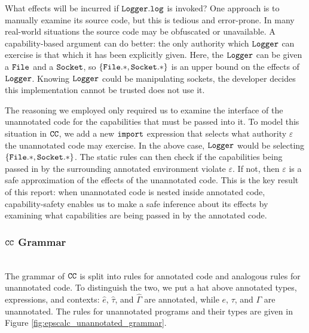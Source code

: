 What effects will be incurred if $\mathtt{Logger.log}$ is invoked? One approach is to manually examine its source code, but this is tedious and error-prone. In many real-world situations the source code may be obfuscated or unavailable. A capability-based argument can do better: the only authority which $\mathtt{Logger}$ can exercise is that which it has been explicitly given. Here, the $\mathtt{Logger}$ can be given a $\mathtt{File}$ and a $\mathtt{Socket}$, so $\mathtt{ \{ \mathtt{File.*, Socket.*} \} }$ is an upper bound on the effects of $\mathtt{Logger}$. Knowing $\mathtt{Logger}$ could be manipulating sockets, the developer decides this implementation cannot be trusted does not use it.

The reasoning we employed only required us to examine the interface of the unannotated code for the capabilities that must be passed into it. To model this situation in $\mathtt{CC}$, we add a new $\mathtt{import}$ expression that selects what authority $\varepsilon$ the unannotated code may exercise. In the above case, $\mathtt{Logger}$ would be selecting $\{ \mathtt{File.*}, \mathtt{Socket.*} \}$. The static rules can then check if the capabilities being passed in by the surrounding annotated environment violate $\varepsilon$. If not, then $\varepsilon$ is a safe approximation of the effects of the unannotated code. This is the key result of this report: when unannotated code is nested inside annotated code, capability-safety enables us to make a safe inference about its effects by examining what capabilities are being passed in by the annotated code.\\


\subsubsection{$\mathtt{CC}$ Grammar}~\\

The grammar of $\mathtt{CC}$ is split into rules for annotated code and analogous rules for unannotated code. To distinguish the two, we put a hat above annotated types, expressions, and contexts: $\hat e$, $\hat \tau$, and $\hat \Gamma$ are annotated, while $e$, $\tau$, and $\Gamma$ are unannotated. The rules for unannotated programs and their types are given in Figure \ref{fig:epscalc_unannotated_grammar}.

